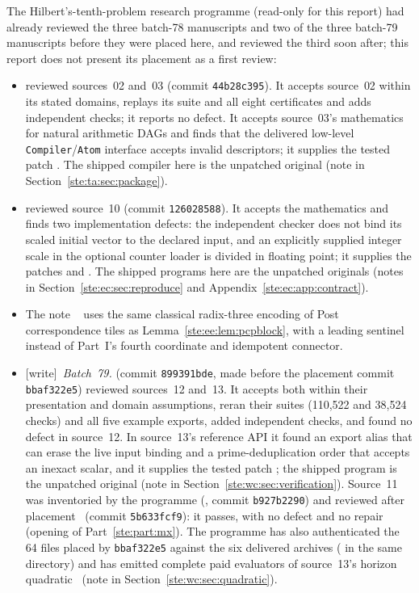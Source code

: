 \documentclass[11pt,letterpaper]{article}
\theoremstyle{definition}
\theoremstyle{remark}
\newcommand{\wtag}{\textup{[write]}}
\begin{document}
The Hilbert's-tenth-problem research programme (read-only for this report) had already reviewed the three batch-78 manuscripts and two of the three batch-79 manuscripts before they were placed here, and reviewed the third soon after; this report does not present its placement as a first review:
\begin{itemize}
\item \cite{review1977} reviewed sources~02 and~03 (commit \texttt{44b28c395}). It accepts source~02 within its stated domains, replays its suite and all eight certificates and adds independent checks; it reports no defect. It accepts source~03's mathematics for natural arithmetic DAGs and finds that the delivered low-level \texttt{Compiler}/\texttt{Atom} interface accepts invalid descriptors; it supplies the tested patch . The shipped compiler here is the unpatched original (note in Section~\ref{ste:ta:sec:package}).
\item \cite{review808} reviewed source~10 (commit \texttt{126028588}). It accepts the mathematics and finds two implementation defects: the independent checker does not bind its scaled initial vector to the declared input, and an explicitly supplied integer scale in the optional counter loader is divided in floating point; it supplies the patches  and . The shipped programs here are the unpatched originals (notes in Section~\ref{ste:ec:sec:reproduce} and Appendix~\ref{ste:ec:app:contract}).
\item The note ~\cite{matrixpcp} uses the same classical radix-three encoding of Post correspondence tiles as Lemma~\ref{ste:ee:lem:pcpblock}, with a leading sentinel instead of Part~I's fourth coordinate and idempotent connector.
\item \wtag\ \emph{Batch~79.} \cite{reviewCG} (commit \texttt{899391bde}, made before the placement commit \texttt{bbaf322e5}) reviewed sources~12 and~13. It accepts both within their presentation and domain assumptions, reran their suites (110,522 and 38,524 checks) and all five example exports, added independent checks, and found no defect in source~12. In source~13's reference API it found an export alias that can erase the live input binding and a prime-deduplication order that accepts an inexact scalar, and it supplies the tested patch ; the shipped program is the unpatched original (note in Section~\ref{ste:wc:sec:verification}). Source~11 was inventoried by the programme (\cite{intake79}, commit \texttt{b927b2290}) and reviewed after placement~\cite{reviewMX} (commit \texttt{5b633fcf9}): it passes, with no defect and no repair (opening of Part~\ref{ste:part:mx}). The programme has also authenticated the 64 files placed by \texttt{bbaf322e5} against the six delivered archives ( in the same directory) and has emitted complete paid evaluators of source~13's horizon quadratic~\cite{slpCG} (note in Section~\ref{ste:wc:sec:quadratic}).
\end{itemize}
\end{document}
